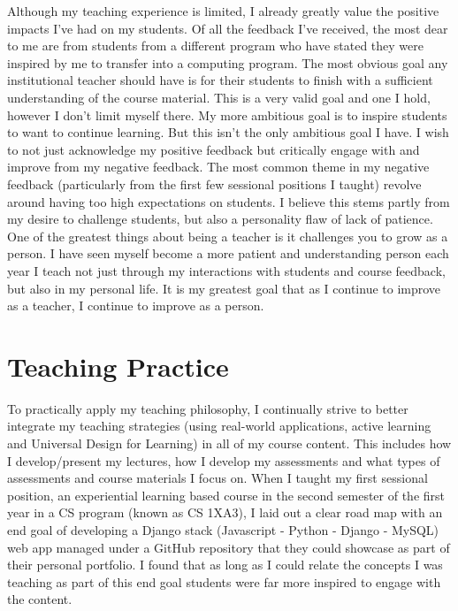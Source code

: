 \documentclass[12pt]{report}
\begin{document}
Although my teaching experience is limited, I already greatly value the
positive impacts I've had on my students. Of all the feedback I've received,
the most dear to me are from students from a different program who have stated
they were inspired by me to transfer into a computing program. The most
obvious goal any institutional teacher should have is for their students to
finish with a sufficient understanding of the course material. This is a very
valid goal and one I hold, however I don't limit myself there. My more
ambitious goal is to inspire students to want to continue learning. But this
isn't the only ambitious goal I have. I wish to not just acknowledge my
positive feedback but critically engage with and improve from my negative
feedback. The most common theme in my negative feedback (particularly from the
first few sessional positions I taught) revolve around having too high
expectations on students. I believe this stems partly from my desire to
challenge students, but also a personality flaw of lack of patience. One of
the greatest things about being a teacher is it challenges you to grow as a
person. I have seen myself become a more patient and understanding person each
year I teach not just through my interactions with students and course
feedback, but also in my personal life. It is my greatest goal that as I
continue to improve as a teacher, I continue to improve as a person.

\part{Teaching Practice}
\label{sec:orgcb011a6}
To practically apply my teaching philosophy, I continually strive to better
integrate my teaching strategies (using real-world applications, active
learning and Universal Design for Learning) in all of my course content. This
includes how I develop/present my lectures, how I develop my assessments and
what types of assessments and course materials I focus on. When I taught my
first sessional position, an experiential learning based course in the second
semester of the first year in a CS program (known as CS 1XA3), I laid out a
clear road map with an end goal of developing a Django stack (Javascript -
Python - Django - MySQL) web app managed under a GitHub repository that they
could showcase as part of their personal portfolio. I found that as long as I
could relate the concepts I was teaching as part of this end goal students
were far more inspired to engage with the content.
\end{document}
